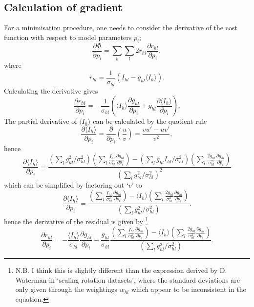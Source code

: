 \documentclass[11pt, oneside]{article}   	%
\begin{document}
\subsection{Calculation of gradient}
For a minimisation procedure, one needs to consider the derivative of the cost function with respect to model parameters $p_i$;
\begin{equation}
\frac{\partial \Phi}{\partial p_i} = \sum_h \sum_l 2 r_{hl} \frac{\partial r_{hl}}{\partial p_i},
\end{equation}
where
\begin{equation}
r_{hl} = \frac{1}{\sigma_{hl}} (I_{hl} - g_{hl} \langle I_h \rangle).
\end{equation}
Calculating the derivative gives
\begin{equation}
\frac{\partial r_{hl}}{\partial p_i} = -\frac{1}{\sigma_{hl}}( \langle I_{h} \rangle \frac{\partial g_{hl}}{\partial p_i} 
+  g_{hl} \frac{\partial \langle I_{h} \rangle}{\partial p_i} ).
\end{equation}
The partial derivative of $\langle I_h \rangle$ can be calculated by the quotient rule
\begin{equation}
\frac{\partial \langle I_{h} \rangle}{\partial p_i} = \frac{\partial}{\partial p_i}(\frac{u}{v}) = \frac{v u' - u v'}{v^2},
\end{equation}
hence
\begin{equation}
\frac{\partial \langle I_{h} \rangle}{\partial p_i} = \frac{(\sum_l g^2_{hl} /\sigma^2_{hl}) (\sum_l  \frac{I_{hl}}{\sigma^2_{hl} }\frac{\partial g_{hl}}{\partial p_i})  -  (\sum_l g_{hl} I_{hl}/\sigma^2_{hl})  (\sum_l \frac{2g_{hl}}{\sigma^2_{hl}} \frac{\partial g_{hl}}{\partial p_i} )        }{ (\sum_l g^2_{hl} /\sigma^2_{hl})^2 } 
\end{equation}
which can be simplified by factoring out `$v$' to
\begin{equation}
\frac{\partial \langle I_{h} \rangle}{\partial p_i}  = \frac{ (\sum_l  \frac{I_{hl}}{\sigma^2_{hl} }\frac{\partial g_{hl}}{\partial p_i})  -   \langle I_{h} \rangle  (\sum_l \frac{2g_{hl}}{\sigma^2_{hl}} \frac{\partial g_{hl}}{\partial p_i} )        }{ (\sum_l g^2_{hl} /\sigma^2_{hl}) }.
\end{equation}
hence the derivative of the residual is given by \footnote{N.B. I think this is slightly different than the expression derived by D. Waterman in `scaling rotation datasets', where the standard deviations are only given through the weightings $w_{hl}$ which appear to be inconsistent in the equation.}
\begin{equation}
\frac{\partial r_{hl}}{\partial p_i} = - \frac{\langle I_{h} \rangle}{\sigma_{hl}} \frac{\partial g_{hl}}{\partial p_i} 
-  \frac{g_{hl}}{\sigma_{hl}}     \frac{ (\sum_l  \frac{I_{hl}}{\sigma^2_{hl} }\frac{\partial g_{hl}}{\partial p_i})  -   \langle I_{h} \rangle  (\sum_l \frac{2g_{hl}}{\sigma^2_{hl}} \frac{\partial g_{hl}}{\partial p_i} )        }{ (\sum_l g^2_{hl} /\sigma^2_{hl}) } .
\end{equation}
\end{document}
